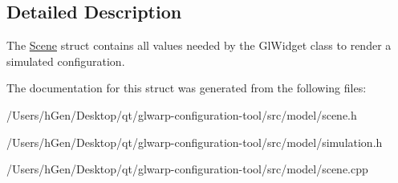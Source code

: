 \subsection{Detailed Description}
The \mbox{\hyperlink{class_scene}{Scene}} struct contains all values needed by the Gl\+Widget class to render a simulated configuration. 

The documentation for this struct was generated from the following files\+:\begin{DoxyCompactItemize}
\item 
/\+Users/h\+Gen/\+Desktop/qt/glwarp-\/configuration-\/tool/src/model/scene.\+h\item 
/\+Users/h\+Gen/\+Desktop/qt/glwarp-\/configuration-\/tool/src/model/simulation.\+h\item 
/\+Users/h\+Gen/\+Desktop/qt/glwarp-\/configuration-\/tool/src/model/scene.\+cpp\end{DoxyCompactItemize}
